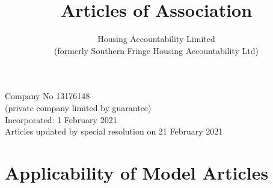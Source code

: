 \documentclass[10pt]{mk-articles-of-association}
\newcommand{\Name}[0]{Housing Accountability Limited}
\begin{document}
\title{
Articles of Association\\
}
\author{\Name{}\\
(formerly Southern Fringe Housing Accountability Ltd)
}
\date{}

\maketitle

\begin{center}
Company No 13176148\\
(private company limited by guarantee)\\
\medskip
Incorporated: 1 February 2021 \\
Articles updated by special resolution on 21 February 2021
\end{center}


\section{Applicability of Model Articles}
\end{document}
